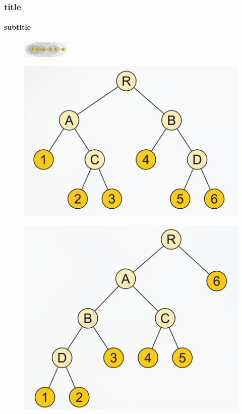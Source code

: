 \documentclass{beamer}
\begin{document}
\begin{frame}[t]
    \frametitle{title}
    \framesubtitle{subtitle}

    \begin{figure}
        \includegraphics[keepaspectratio, width=0.2\textwidth]{res/agglo_clustering.png}
    \end{figure}

    \begin{figure}
        \includegraphics[scale=0.2]{res/original_treelet.png}
    \end{figure}

    \begin{figure}
        \includegraphics[scale=0.2]{res/new_treelet.png}
    \end{figure}

\end{frame}
\end{document}
